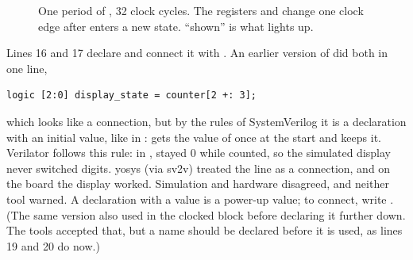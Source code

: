 \begin{figure}[ht]
\centering
{}
\caption{One period of , 32 clock cycles. The registers
 and  change one clock edge after
 enters a new state. ``shown'' is what lights up.}
\label{fig:step03-mux}
\end{figure}

\begin{pitfall}
Lines 16 and 17 declare  and connect it with .
An earlier version of  did both in one line,
\begin{lstlisting}
logic [2:0] display_state = counter[2 +: 3];
\end{lstlisting}
which looks like a connection, but by the rules of SystemVerilog it is a
declaration with an initial value, like  in :
 gets the value of  once at the start and
keeps it. Verilator follows this rule: in , 
stayed 0 while  counted, so the simulated display never switched
digits. yosys (via sv2v) treated the line as a connection, and on the board
the display worked. Simulation and hardware disagreed, and neither tool
warned. A declaration with a value is a power-up value; to connect, write
. (The same version also used  in the clocked block
before declaring it further down. The tools accepted that, but a name should
be declared before it is used, as lines 19 and 20 do now.)
\end{pitfall}

